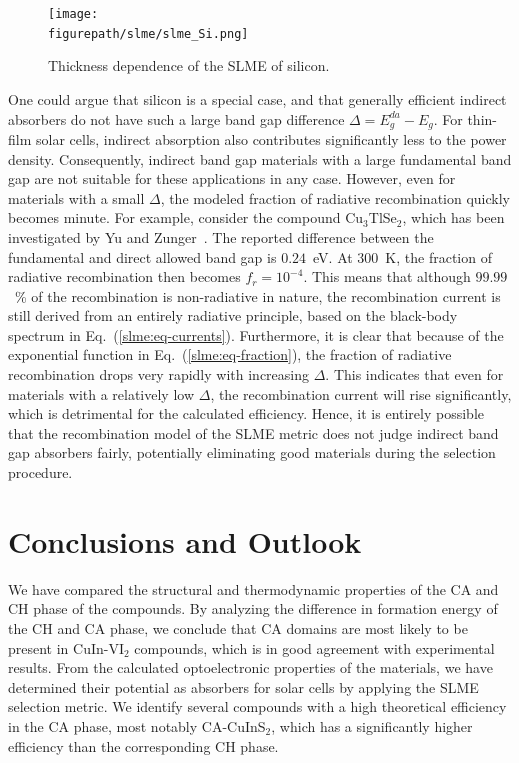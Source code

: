 \begin{refsection}
\begin{figure}[ht] 
	\centering 
		\texttt{[image: \\figurepath/slme/slme\_Si.png]} 
	\caption{Thickness dependence of the SLME of silicon.} 
	\label{slme:fig-SLME_Si} 
\end{figure} 
 
One could argue that silicon is a special case, and that generally efficient 
indirect absorbers do not have such a large band gap difference \mbox{$\Delta 
= E_g ^{da}- E_g$}. For thin-film solar cells, indirect absorption also 
contributes significantly less to the power density. Consequently, indirect 
band gap materials with a large fundamental band gap are not suitable for 
these applications in any case. However, even for materials with a small 
$\Delta$, the modeled fraction of radiative recombination quickly becomes 
minute. For example, consider the compound Cu$_3$TlSe$_2$, which has been 
investigated by Yu and Zunger~\cite{Yu2012}. The reported difference between 
the fundamental and direct allowed band gap is $0.24$~\si{\electronvolt}. At 
300~\si{\kelvin}, the fraction of radiative recombination then becomes 
\mbox{$f_r = 10^{-4}$}. This means that although $99.99$~\% of the 
recombination is non-radiative in nature, the recombination current is 
still derived from an entirely radiative principle, based on the black-body 
spectrum in Eq.~(\ref{slme:eq-currents}). Furthermore, it is clear that 
because of the exponential function in Eq.~(\ref{slme:eq-fraction}), the 
fraction of radiative recombination drops very rapidly with increasing 
$\Delta$. This indicates that even for materials with a relatively low 
$\Delta$, the recombination current will rise significantly, which is 
detrimental for the calculated efficiency. Hence, it is entirely possible that 
the recombination model of the SLME metric does not judge indirect band gap 
absorbers fairly, potentially eliminating good materials during the selection 
procedure.\\ 
 
\section{Conclusions and Outlook} 
 
We have compared the structural and thermodynamic properties of the CA and CH 
phase of the compounds. By analyzing the difference in formation energy of the 
CH and CA phase, we conclude that CA domains are most likely to be present in 
\mbox{CuIn-VI$_2$} compounds, which is in good agreement with experimental 
results. From the calculated optoelectronic properties of the materials, we 
have determined their potential as absorbers for solar cells by applying the 
SLME selection metric. We identify several compounds with a high theoretical 
efficiency in the CA phase, most notably \mbox{CA-CuInS$_2$}, which has a 
significantly higher efficiency than the corresponding CH phase. 
 

\end{refsection}
